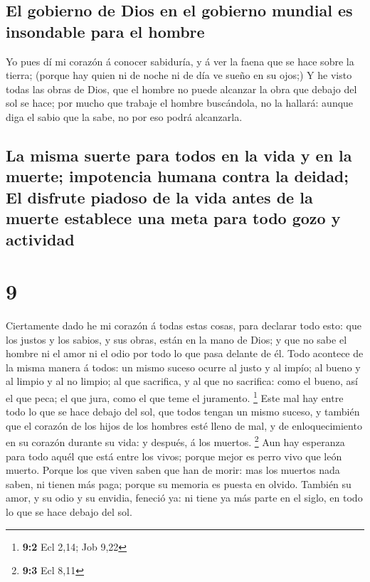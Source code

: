 \hypertarget{el-gobierno-de-dios-en-el-gobierno-mundial-es-insondable-para-el-hombre}{%
\subsection{El gobierno de Dios en el gobierno mundial es insondable
para el
hombre}\label{el-gobierno-de-dios-en-el-gobierno-mundial-es-insondable-para-el-hombre}}

 Yo pues dí mi corazón á conocer sabiduría, y á ver la
faena que se hace sobre la tierra; (porque hay quien ni de noche ni de
día ve sueño en su ojos;)  Y he visto todas las obras de
Dios, que el hombre no puede alcanzar la obra que debajo del sol se
hace; por mucho que trabaje el hombre buscándola, no la hallará: aunque
diga el sabio que la sabe, no por eso podrá alcanzarla.

\hypertarget{la-misma-suerte-para-todos-en-la-vida-y-en-la-muerte-impotencia-humana-contra-la-deidad-el-disfrute-piadoso-de-la-vida-antes-de-la-muerte-establece-una-meta-para-todo-gozo-y-actividad}{%
\subsection{La misma suerte para todos en la vida y en la muerte;
impotencia humana contra la deidad; El disfrute piadoso de la vida antes
de la muerte establece una meta para todo gozo y
actividad}\label{la-misma-suerte-para-todos-en-la-vida-y-en-la-muerte-impotencia-humana-contra-la-deidad-el-disfrute-piadoso-de-la-vida-antes-de-la-muerte-establece-una-meta-para-todo-gozo-y-actividad}}

\hypertarget{section-8}{%
\section{9}\label{section-8}}

 Ciertamente dado he mi corazón á todas estas cosas, para
declarar todo esto: que los justos y los sabios, y sus obras, están en
la mano de Dios; y que no sabe el hombre ni el amor ni el odio por todo
lo que pasa delante de él.  Todo acontece de la misma manera
á todos: un mismo suceso ocurre al justo y al impío; al bueno y al
limpio y al no limpio; al que sacrifica, y al que no sacrifica: como el
bueno, así el que peca; el que jura, como el que teme el juramento.
\footnote{\textbf{9:2} Ecl 2,14; Job 9,22}  Este mal hay
entre todo lo que se hace debajo del sol, que todos tengan un mismo
suceso, y también que el corazón de los hijos de los hombres esté lleno
de mal, y de enloquecimiento en su corazón durante su vida: y después, á
los muertos. \footnote{\textbf{9:3} Ecl 8,11}  Aun hay
esperanza para todo aquél que está entre los vivos; porque mejor es
perro vivo que león muerto.  Porque los que viven saben que
han de morir: mas los muertos nada saben, ni tienen más paga; porque su
memoria es puesta en olvido.  También su amor, y su odio y
su envidia, feneció ya: ni tiene ya más parte en el siglo, en todo lo
que se hace debajo del sol.

